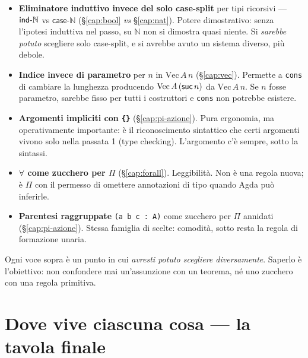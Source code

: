 \begin{itemize}
\item \textbf{Eliminatore induttivo invece del solo case-split} per tipi ricorsivi --- $\mathsf{ind\text{-}\mathbb{N}}$ vs $\mathsf{case\text{-}\mathbb{N}}$ (\S\ref{cap:bool} \emph{vs} \S\ref{cap:nat}). Potere dimostrativo: senza l'ipotesi induttiva nel passo, su $\mathbb{N}$ non si dimostra quasi niente. Si \emph{sarebbe potuto} scegliere solo case-split, e si avrebbe avuto un sistema diverso, pi\`u debole.

\item \textbf{Indice invece di parametro} per $n$ in $\mathrm{Vec}\,A\,n$ (\S\ref{cap:vec}). Permette a \texttt{cons} di cambiare la lunghezza producendo $\mathrm{Vec}\,A\,(\mathsf{suc}\,n)$ da $\mathrm{Vec}\,A\,n$. Se $n$ fosse parametro, sarebbe fisso per tutti i costruttori e \texttt{cons} non potrebbe esistere.

\item \textbf{Argomenti impliciti con \texttt{\{\}}} (\S\ref{cap:pi-azione}). Pura ergonomia, ma operativamente importante: \`e il riconoscimento sintattico che certi argomenti vivono solo nella passata 1 (type checking). L'argomento c'\`e sempre, sotto la sintassi.

\item \textbf{$\forall$ come zucchero per $\Pi$} (\S\ref{cap:forall}). Leggibilit\`a. Non \`e una regola nuova; \`e $\Pi$ con il permesso di omettere annotazioni di tipo quando Agda pu\`o inferirle.

\item \textbf{Parentesi raggruppate} \texttt{(a b c : A)} come zucchero per $\Pi$ annidati (\S\ref{cap:pi-azione}). Stessa famiglia di scelte: comodit\`a, sotto resta la regola di formazione unaria.
\end{itemize}

\bigskip

\noindent Ogni voce sopra \`e un punto in cui \emph{avresti potuto scegliere diversamente}. Saperlo \`e l'obiettivo: non confondere mai un'assunzione con un teorema, n\'e uno zucchero con una regola primitiva.

\bigskip
\bigskip

\section*{Dove vive ciascuna cosa --- la tavola finale}

